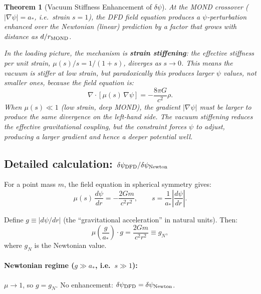 \documentclass[11pt,a4paper]{article}
\newtheorem{theorem}{Theorem}[section]
\begin{document}
\begin{theorem}[Vacuum Stiffness Enhancement of $\delta\psi$]
\label{thm:stiffness-enhancement}
At the MOND crossover ($|\nabla\psi| = a_*$, i.e.\ strain $s = 1$), the
DFD field equation produces a $\psi$-perturbation enhanced over the
Newtonian (linear) prediction by a factor that grows with distance as
$d/r_{\rm MOND}$.

In the loading picture, the mechanism is \textbf{strain stiffening}: the
effective stiffness per unit strain, $\mu(s)/s = 1/(1+s)$, diverges as
$s \to 0$.  This means the vacuum is \emph{stiffer} at low strain, but
paradoxically this produces \emph{larger} $\psi$ values, not smaller ones,
because the field equation is:
\begin{equation}
\nabla\cdot\!\left[\mu(s)\,\nabla\psi\right] = -\frac{8\pi G}{c^2}\rho.
\end{equation}
When $\mu(s) \ll 1$ (low strain, deep MOND), the gradient $|\nabla\psi|$
must be \emph{larger} to produce the same divergence on the left-hand side.
The vacuum stiffening reduces the effective gravitational coupling, but
the constraint forces $\psi$ to adjust, producing a larger gradient and
hence a deeper potential well.
\end{theorem}

\subsection{Detailed calculation: $\delta\psi_{\rm DFD}/\delta\psi_{\rm Newton}$}

For a point mass $m$, the field equation in spherical symmetry gives:
\begin{equation}
\mu(s)\,\frac{d\psi}{dr} = -\frac{2Gm}{c^2 r^2},
\qquad
s = \frac{1}{a_*}\left|\frac{d\psi}{dr}\right|.
\end{equation}

Define $g \equiv |d\psi/dr|$ (the ``gravitational acceleration'' in natural
units).  Then:
\begin{equation}
\mu\!\left(\frac{g}{a_*}\right)\cdot g = \frac{2Gm}{c^2 r^2} \equiv g_N,
\end{equation}
where $g_N$ is the Newtonian value.

\paragraph{Newtonian regime ($g \gg a_*$, i.e.\ $s \gg 1$):}
$\mu \to 1$, so $g = g_N$.  No enhancement: $\delta\psi_{\rm DFD}
= \delta\psi_{\rm Newton}$.
\end{document}
